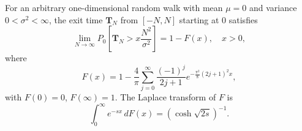 For an arbitrary one-dimensional random walk with mean $\mu = 0$ and variance $0 < \sigma^2 < \infty$, the exit time $\mathbf{T}_N$ from $[-N,N]$ starting at $0$ satisfies
$$\lim_{N \to \infty} P_0\left[ \mathbf{T}_N > x \frac{N^2}{\sigma^2} \right] = 1 - F(x), \quad x > 0,$$
where
$$F(x) = 1 - \frac{4}{\pi} \sum_{j=0}^{\infty} \frac{(-1)^j}{2j+1} e^{-\frac{\pi^2}{8}(2j+1)^2 x},$$
with $F(0) = 0$, $F(\infty) = 1$. The Laplace transform of $F$ is
$$\int_0^\infty e^{-sx} \, dF(x) = (\cosh \sqrt{2s})^{-1}.$$
